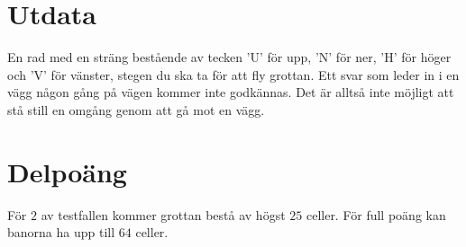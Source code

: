 \section*{Utdata}
En rad med en sträng bestående av tecken 'U' för upp, 'N' för ner, 'H' för höger och 'V' för vänster, stegen du ska ta för att fly grottan. Ett svar som leder in i en vägg någon gång på vägen kommer inte godkännas. Det är alltså inte möjligt att stå still en omgång genom att gå mot en vägg.

\section*{Delpoäng}
För $2$ av testfallen kommer grottan bestå av högst $25$ celler. För full poäng kan banorna ha upp till $64$ celler.
